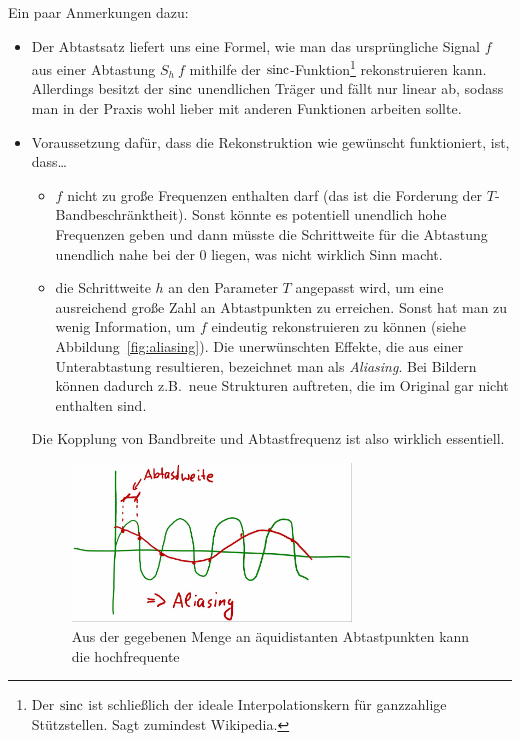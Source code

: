 \begin{remark}
Ein paar Anmerkungen dazu:
\begin{itemize}
\item Der Abtastsatz liefert uns eine Formel, wie man das ursprüngliche Signal $ f $ aus einer
  Abtastung $ S_{h} \ f $ mithilfe der $ \operatorname{sinc} $-Funktion\footnote{Der $ \operatorname{sinc} $ ist schließlich 
  der ideale Interpolationskern für ganzzahlige Stützstellen. Sagt zumindest Wikipedia.} 
  rekonstruieren kann. Allerdings besitzt der $ \operatorname{sinc} $ unendlichen Träger und fällt nur linear ab, 
  sodass man in der Praxis wohl lieber mit anderen Funktionen arbeiten sollte. 
\item Voraussetzung dafür, dass die Rekonstruktion wie gewünscht funktioniert, ist, dass\dots
  \begin{itemize}
  \item $ f $ nicht zu große Frequenzen enthalten darf (das ist die Forderung der
    $ T $-Bandbeschränktheit). Sonst könnte es potentiell unendlich hohe Frequenzen geben und dann
    müsste die Schrittweite für die Abtastung unendlich nahe bei der $ 0 $ liegen, was nicht
    wirklich Sinn macht.
  \item die Schrittweite $ h $ an den Parameter $ T $ angepasst wird, um eine ausreichend große 
    Zahl an Abtastpunkten zu erreichen. Sonst hat man zu wenig Information, um $ f $ eindeutig 
    rekonstruieren zu können (siehe Abbildung~\ref{fig:aliasing}). Die unerwünschten Effekte, die 
    aus einer Unterabtastung resultieren, bezeichnet man als \emph{Aliasing}. Bei Bildern können 
    dadurch z.B.\ neue Strukturen auftreten, die im Original gar nicht enthalten sind.
  \end{itemize}
  Die Kopplung von Bandbreite und Abtastfrequenz ist also wirklich essentiell. 
  \begin{figure}[ht]
  	\centering
    \includegraphics[width=0.7\textwidth]{Bilder/Aliasing}
  	\caption{Aus der gegebenen Menge an äquidistanten Abtastpunkten kann die hochfrequente 
}
\end{figure}
\end{itemize}
\end{remark}
